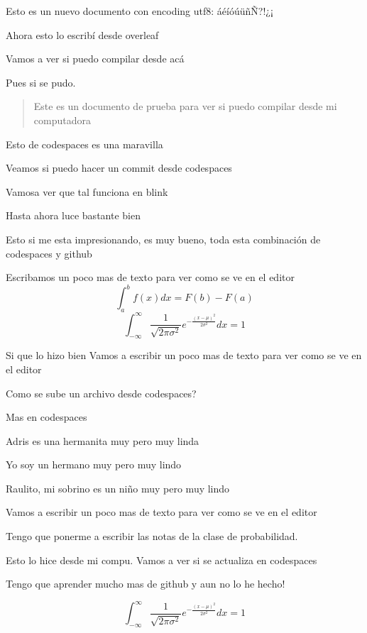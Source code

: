 \documentclass{article}
\begin{document}
	
	Esto es un nuevo documento con encoding utf8: áéíóúüñÑ?!¿¡

 Ahora esto lo escribí desde overleaf
 
 Vamos a ver si puedo compilar desde acá

 Pues si se pudo.

 \begin{abstract}
	Este es un documento de prueba para ver si puedo compilar desde mi computadora
 \end{abstract}

 Esto de codespaces es una maravilla


Veamos si puedo hacer un commit desde codespaces

Vamosa ver que tal funciona en blink


Hasta ahora luce bastante bien

Esto si me esta impresionando, es muy bueno, toda esta combinación de codespaces y github

Escribamos un poco mas de texto para ver como se ve en el editor
\begin{equation}
	\int_{a}^{b} f(x) dx = F(b) - F(a)
\end{equation}
\begin{equation}
	\int_{-\infty}^{\infty} \frac{1}{\sqrt{2\pi\sigma^2}} e^{-\frac{(x-\mu)^2}{2\sigma^2}} dx = 1
\end{equation}

Si que lo hizo bien
Vamos a escribir un poco mas de texto para ver como se ve en el editor


Como se sube un archivo desde codespaces?

Mas en codespaces

Adris es una hermanita muy pero muy linda

Yo soy un hermano muy pero muy lindo

Raulito, mi sobrino es un niño muy pero muy lindo

Vamos a escribir un poco mas de texto para ver como se ve en el editor

Tengo que ponerme a escribir las notas de la clase de probabilidad.

Esto lo hice desde mi compu. Vamos a ver si se actualiza en codespaces


Tengo que aprender mucho mas de github y aun no lo he hecho!

$$
\int_{-\infty}^{\infty} \frac{1}{\sqrt{2\pi\sigma^2}} e^{-\frac{(x-\mu)^2}{2\sigma^2}} dx = 1
$$
\end{document}
